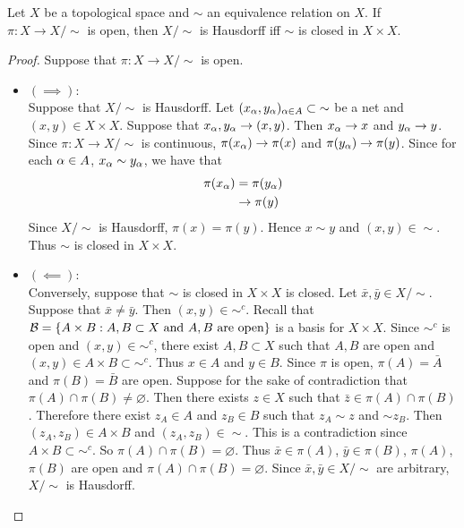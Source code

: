 \documentclass{book}
\begin{document}
	\begin{ex} 
		Let $X$ be a topological space and $\sim$ an equivalence relation on $X$. If $\pi: X \rightarrow X / \sim$ is open, then $X / \sim$ is Hausdorff iff $\sim$ is closed in $X \times X$.
	\end{ex}
	
	\begin{proof}
		Suppose that $\pi:X \rightarrow X / \sim$ is open. 
		\begin{itemize}
			\item $(\implies)$: \\
			Suppose that $X/\sim$ is Hausdorff. Let $(x_{\alpha}, y_{\alpha})_{\alpha \in A} \subset {\sim}$ be a net and $(x,y) \in X \times X$. Suppose that $x_{\alpha}, y_{\alpha} \rightarrow (x,y)$. Then $x_{\alpha} \rightarrow x$ and $y_{\alpha} \rightarrow y$. Since $\pi:X \rightarrow X / \sim$ is continuous, $\pi(x_{\alpha}) \rightarrow \pi(x)$ and $\pi(y_{\alpha}) \rightarrow \pi(y)$. Since for each $\alpha \in A$, $x_{\alpha} \sim y_{\alpha}$, we have that 
			\begin{align*}
				\pi(x_{\alpha}) 
				& = \pi(y_{\alpha})\\
				& \rightarrow \pi(y)
			\end{align*}
			Since $X/ \sim$ is Hausdorff, $\pi(x) = \pi(y)$. Hence $x \sim y$ and $(x,y) \in {\sim}$. Thus $\sim$ is closed in $X \times X$.\\
			\item $(\impliedby)$: \\
			Conversely, suppose that $\sim$ is closed in $X \times X$ is closed. Let $\bar{x}, \bar{y} \in X / \sim$. Suppose that $\bar{x} \neq \bar{y}$. Then $(x,y) \in {\sim^c}$. Recall that $\mathcal{B} =\{A \times B: A,B \subset X \text{ and $A, B$ are open} \}$ is a basis for $X \times X$. Since  ${\sim^c}$ is open and $(x,y) \in {\sim^c}$, there exist $A,B \subset X$ such that $A,B$ are open and $(x,y) \in A \times B \subset  {\sim^c}$. Thus $x \in A$ and $y \in B$. Since $\pi$ is open, $\pi(A) = \bar{A}$ and $\pi(B) = \bar{B}$ are open. Suppose for the sake of contradiction that $\pi(A) \cap \pi(B) \neq \varnothing$. Then there exists $z \in X$ such that $\bar{z} \in \pi(A) \cap \pi(B)$. Therefore there exist $z_A \in A$ and $z_B \in B$ such that $z_A \sim z$ and $\sim z_B$. Then $(z_A, z_B) \in A \times B$ and $(z_A, z_B) \in {\sim}$. This is a contradiction since $A \times B \subset  {\sim^c}$. So $\pi(A) \cap \pi(B) = \varnothing$. Thus $\bar{x} \in \pi(A)$, $\bar{y} \in \pi(B)$, $\pi(A)$, $\pi(B)$ are open and $\pi(A) \cap \pi(B) = \varnothing$. Since $\bar{x}, \bar{y} \in X / {\sim}$ are arbitrary, $X / {\sim}$ is Hausdorff.
		\end{itemize}
	\end{proof}
	
\end{document}
